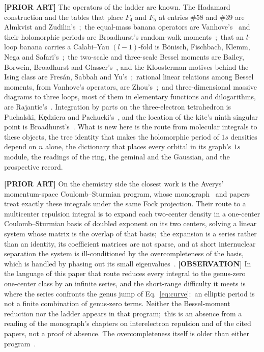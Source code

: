 \documentclass[aps,pra,twocolumn,superscriptaddress,longbibliography]{revtex4-2}
\begin{document}
\textbf{[PRIOR ART]} The operators of the ladder are known.  The Hadamard
construction and the tables that place $F_4$ and $F_5$ at entries \#58 and
\#39 are Almkvist and Zudilin's~\cite{almkvist_zudilin2007,aesz2005};\ the
equal-mass banana operators are Vanhove's~\cite{vanhove2014} and their
holomorphic periods are Broadhurst's random-walk
moments~\cite{broadhurst2009walks};\ that an $l$-loop banana carries a
Calabi--Yau $(l-1)$-fold is B\"onisch, Fischbach, Klemm, Nega and
Safari's~\cite{bonisch2021};\ the two-scale and three-scale Bessel moments
are Bailey, Borwein, Broadhurst and Glasser's~\cite{bbbg2008}, and the
Kloosterman motives behind the Ising class are Fres\'an, Sabbah and
Yu's~\cite{fresansabbahyu2023};\ rational linear relations among Bessel
moments, from Vanhove's operators, are Zhou's~\cite{zhou2022};\ and
three-dimensional massive diagrams to three loops, most of them in
elementary functions and dilogarithms, are Rajantie's~\cite{rajantie1996}.  Integration by parts on the three-electron
tetrahedron is Puchalski, K\c{e}dziera and Pachucki's~\cite{pkp2009}, and
the location of the kite's ninth singular point is
Broadhurst's~\cite{broadhurst2022kites}.
What is new here is the route from molecular integrals to these objects, the
tree identity that makes the holomorphic period of $1s$ densities depend on
$n$ alone, the
dictionary that places every orbital in its graph's $1s$ module, the readings
of the ring, the geminal and the Gaussian, and the prospective record.

\textbf{[PRIOR ART]} On the chemistry side the closest work is the Averys'
momentum-space Coulomb--Sturmian program, whose monograph~\cite{avery_avery_book2018}
and papers~\cite{avery2013,avery_avery2015,avery_avery_4center} treat
exactly these integrals under the same Fock projection.  Their route to a
multicenter repulsion integral is to expand each two-center density in a
one-center Coulomb--Sturmian basis of doubled exponent on its two centers,
solving a linear system whose matrix is the overlap of that basis;\ the
expansion is a series rather than an identity, its coefficient matrices are
not sparse, and at short internuclear separation the system is ill-conditioned
by the overcompleteness of the basis, which is handled by phasing out its
small eigenvalues~\cite{avery2013}.  \textbf{[OBSERVATION]} In the language
of this paper that route
reduces every integral to the genus-zero one-center class by an infinite
series, and the short-range difficulty it meets is where the series
confronts the genus jump of Eq.~\eqref{eq:curve}:\ an elliptic period is
not a finite combination of genus-zero terms.  Neither the Bessel-moment
reduction nor the ladder appears in that program;\ this is an absence from a
reading of the monograph's chapters on interelectron repulsion and of the
cited papers, not a proof of absence.  The overcompleteness itself is older
than either program~\cite{monkhorst_jeziorski1979}.
\end{document}
